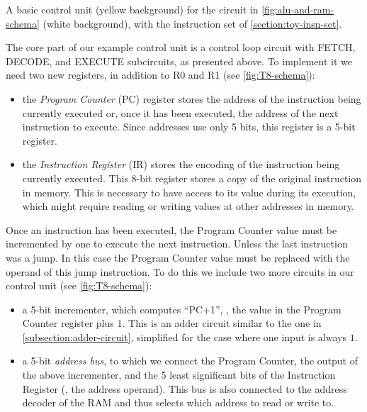 \begin{Figure}
  

  \caption{A basic control unit (yellow background) for the circuit in
  \cref{fig:alu-and-ram-schema} (white background), with the instruction set of
  \cref{section:toy-insn-set}.}\label{fig:T8-schema}
\end{Figure}

The core part of our example control unit is a control loop circuit with FETCH,
DECODE, and EXECUTE subcircuits, as presented above. To implement it we need
two new registers, in addition to R0 and R1 (see \cref{fig:T8-schema}):
\begin{itemize}
  \item the {\em Program Counter} (PC) register stores the address of the
  instruction being currently executed or, once it has been executed, the
  address of the next instruction to execute. Since addresses use only 5 bits,
  this register is a 5-bit register.

  \item the {\em Instruction Register} (IR) stores the encoding of the
  instruction being currently executed. This 8-bit register stores a copy of
  the original instruction in memory. This is necessary to have access to its
  value during its execution, which might require reading or writing values at
  other addresses in memory.
\end{itemize}

Once an instruction has been executed, the Program Counter value must be
incremented by one to execute the next instruction. Unless the last instruction
was a jump. In this case the Program Counter value must be replaced with the
operand of this jump instruction. To do this we include two more circuits in
our control unit (see \cref{fig:T8-schema}):
\begin{itemize}
  \item a 5-bit incrementer, which computes ``PC+1'', \ie, the value in the
  Program Counter register plus $1$. This is an adder circuit similar to the one
  in \cref{subsection:adder-circuit}, simplified for the case where one
  input is always $1$.

  \item a 5-bit {\em address bus}, to which we connect the Program Counter, the
  output of the above incrementer, and the 5 least significant bits of the
  Instruction Register (\ie, the address operand). This bus is also connected
  to the address decoder of the RAM and thus selects which address to read or
  write to.
\end{itemize}

